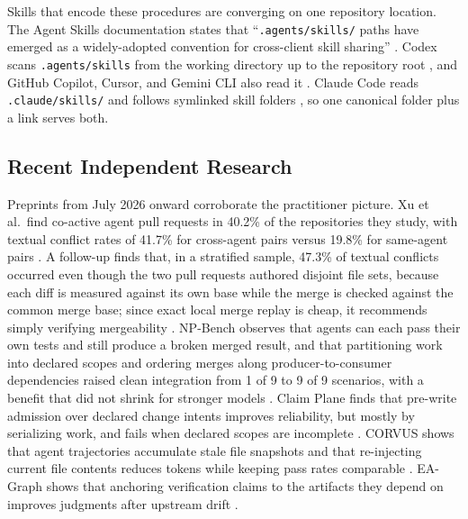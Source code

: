 \documentclass[11pt]{article}
\begin{document}
Skills that encode these procedures are converging on one repository location. The Agent Skills documentation states that ``\texttt{.agents/skills/} paths have emerged as a widely-adopted convention for cross-client skill sharing'' \cite{agentskills2026clients}. Codex scans \texttt{.agents/skills} from the working directory up to the repository root \cite{openai2026codexskills}, and GitHub Copilot, Cursor, and Gemini CLI also read it \cite{github2026skills,cursor2026skills,google2026geminiskills}. Claude Code reads \texttt{.claude/skills/} and follows symlinked skill folders \cite{anthropic2026skills}, so one canonical folder plus a link serves both.

\subsection{Recent Independent Research}
Preprints from July 2026 onward corroborate the practitioner picture. Xu et al.\ find co-active agent pull requests in 40.2\% of the repositories they study, with textual conflict rates of 41.7\% for cross-agent pairs versus 19.8\% for same-agent pairs \cite{xu2026agentprs}. A follow-up finds that, in a stratified sample, 47.3\% of textual conflicts occurred even though the two pull requests authored disjoint file sets, because each diff is measured against its own base while the merge is checked against the common merge base; since exact local merge replay is cheap, it recommends simply verifying mergeability \cite{subramanian2026lineage}. NP-Bench observes that agents can each pass their own tests and still produce a broken merged result, and that partitioning work into declared scopes and ordering merges along producer-to-consumer dependencies raised clean integration from 1 of 9 to 9 of 9 scenarios, with a benefit that did not shrink for stronger models \cite{muku2026npbench}. Claim Plane finds that pre-write admission over declared change intents improves reliability, but mostly by serializing work, and fails when declared scopes are incomplete \cite{nikolaev2026claimplane}. CORVUS shows that agent trajectories accumulate stale file snapshots and that re-injecting current file contents reduces tokens while keeping pass rates comparable \cite{zheng2026corvus}. EA-Graph shows that anchoring verification claims to the artifacts they depend on improves judgments after upstream drift \cite{hsu2026eagraph}.
\end{document}
